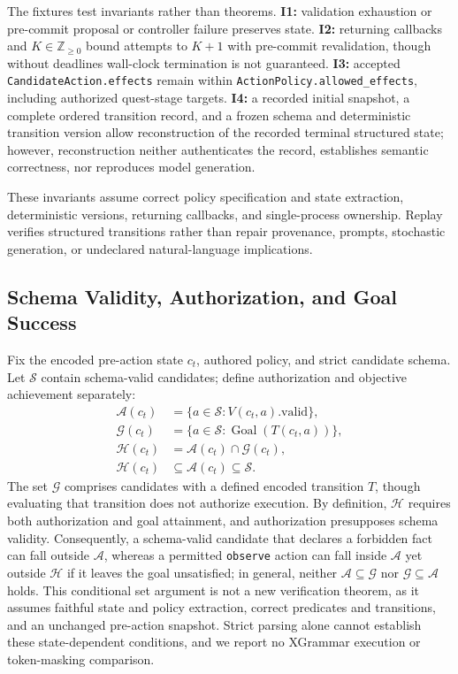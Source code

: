 \documentclass[journal]{IEEEtran}
\begin{document}
The fixtures test invariants rather than theorems. \textbf{I1:} validation exhaustion or pre-commit proposal or controller failure preserves state. \textbf{I2:} returning callbacks and $K\in\mathbb{Z}_{\geq 0}$ bound attempts to $K+1$ with pre-commit revalidation, though without deadlines wall-clock termination is not guaranteed. \textbf{I3:} accepted \texttt{CandidateAction.effects} remain within \texttt{ActionPolicy.allowed\_effects}, including authorized quest-stage targets. \textbf{I4:} a recorded initial snapshot, a complete ordered transition record, and a frozen schema and deterministic transition version allow reconstruction of the recorded terminal structured state; however, reconstruction neither authenticates the record, establishes semantic correctness, nor reproduces model generation.

These invariants assume correct policy specification and state extraction, deterministic versions, returning callbacks, and single-process ownership. Replay verifies structured transitions rather than repair provenance, prompts, stochastic generation, or undeclared natural-language implications.

\subsection{Schema Validity, Authorization, and Goal Success}\label{sec:authorization-sets}
Fix the encoded pre-action state $c_t$, authored policy, and strict candidate schema. Let $\mathcal{S}$ contain schema-valid candidates; define authorization and objective achievement separately:
\begin{equation}
\begin{aligned}
\mathcal{A}(c_t)&=\{a\in\mathcal{S}:V(c_t,a).\mathrm{valid}\},\\
\mathcal{G}(c_t)&=\{a\in\mathcal{S}:\operatorname{Goal}(T(c_t,a))\},\\
\mathcal{H}(c_t)&=\mathcal{A}(c_t)\cap\mathcal{G}(c_t),\\
\mathcal{H}(c_t)&\subseteq\mathcal{A}(c_t)\subseteq\mathcal{S}.
\end{aligned}
\end{equation}
The set $\mathcal{G}$ comprises candidates with a defined encoded transition $T$, though evaluating that transition does not authorize execution. By definition, $\mathcal{H}$ requires both authorization and goal attainment, and authorization presupposes schema validity. Consequently, a schema-valid candidate that declares a forbidden fact can fall outside $\mathcal{A}$, whereas a permitted \texttt{observe} action can fall inside $\mathcal{A}$ yet outside $\mathcal{H}$ if it leaves the goal unsatisfied; in general, neither $\mathcal{A}\subseteq\mathcal{G}$ nor $\mathcal{G}\subseteq\mathcal{A}$ holds. This conditional set argument is not a new verification theorem, as it assumes faithful state and policy extraction, correct predicates and transitions, and an unchanged pre-action snapshot. Strict parsing alone cannot establish these state-dependent conditions, and we report no XGrammar execution or token-masking comparison.
\end{document}
